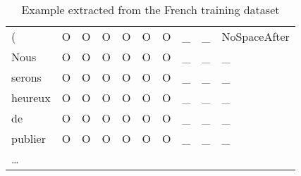 \begin{table}
{\begin{tabular}{l|ll|lll|l|ll|l}
            (                                   & O                              & O                            & O             & O                        & O    & O             & \_      & \_   & NoSpaceAfter \\
            Nous                                & O                              & O                            & O             & O                        & O    & O             & \_      & \_   & \_           \\
            serons                              & O                              & O                            & O             & O                        & O    & O             & \_      & \_   & \_           \\
            heureux                             & O                              & O                            & O             & O                        & O    & O             & \_      & \_   & \_           \\
            de                                  & O                              & O                            & O             & O                        & O    & O             & \_      & \_   & \_           \\
            publier                             & O                              & O                            & O             & O                        & O    & O             & \_      & \_   & \_           \\
            \dots                                                                                                                                                                                                 \\
        \end{tabular}
    }
    \caption{Example extracted from the French training dataset}
    \label{extraitCorpus}
\end{table}
\vspace{-1cm}
%

